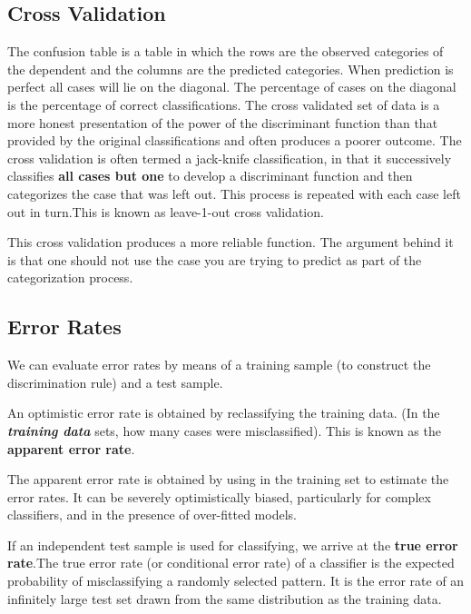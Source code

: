 \subsection{Cross Validation}

The confusion
table is a table in which the rows are the observed categories of the dependent and
the columns are the predicted categories. When prediction is perfect all cases will lie on the
diagonal. The percentage of cases on the diagonal is the percentage of correct classifications. 
The cross validated set of data is a more honest presentation of the power of the
discriminant function than that provided by the original classifications and often produces
a poorer outcome. The cross validation is often termed a jack-knife classification, in that
it successively classifies \textbf{all cases but one} to develop a discriminant function and then
categorizes the case that was left out. This process is repeated with each case left out in
turn.This is known as leave-1-out cross validation. 

This cross validation produces a more reliable function. The argument behind it is that
one should not use the case you are trying to predict as part of the categorization process.


\subsection{Error Rates}

We can evaluate error rates by means of a training sample (to construct the discrimination rule) and a test sample.


An optimistic error rate is obtained by reclassifying the training data. (In the \textbf{\textit{training data}} sets, how many cases were misclassified). This is known as the \textbf{apparent error rate}.


The apparent error rate is obtained by using in the training set to estimate
the error rates. It can be severely optimistically biased, particularly for complex classifiers, and in the presence of over-fitted models.


If an independent test sample is used for classifying, we arrive at the  \textbf{true error rate}.The true error rate (or conditional error rate) of a classifier is the expected
probability of misclassifying a randomly selected pattern.
It is the error rate of an infinitely large test set drawn from the same distribution as the training data.



